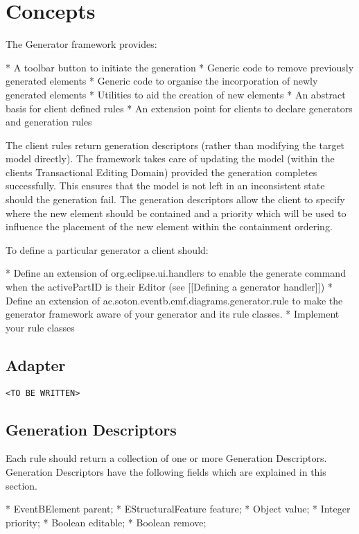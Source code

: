 \section{Concepts}
\label{sec:concepts}

The Generator framework provides:

* A toolbar button to initiate the generation
* Generic code to remove previously generated elements
* Generic code to organise the incorporation of newly generated elements
* Utilities to aid the creation of new elements
* An abstract basis for client defined rules
* An extension point for clients to declare generators and generation rules

The client rules return generation descriptors (rather than modifying the target model directly). The framework takes care of updating the model (within the clients Transactional Editing Domain) provided the generation completes successfully. This ensures that the model is not left in an inconsistent state should the generation fail. The generation descriptors allow the client to specify where the new element should be contained and a priority which will be used to influence the placement of the new element within the containment ordering.

To define a particular generator a client should:

* Define an extension of org.eclipse.ui.handlers to enable the generate command when the activePartID is their Editor (see [[Defining a generator handler]])
* Define an extension of ac.soton.eventb.emf.diagrams.generator.rule to make the generator framework aware of your generator and its rule classes.
* Implement your rule classes

\subsection{Adapter}
\label{sec:adapter}

\texttt{<TO BE WRITTEN>}

\subsection{Generation Descriptors}
\label{sec:descriptors}

Each rule should return a collection of one or more Generation Descriptors. Generation Descriptors have the following fields which are explained in this section.

* EventBElement parent;
* EStructuralFeature feature;
* Object value;
* Integer priority;
* Boolean editable;
* Boolean remove;


